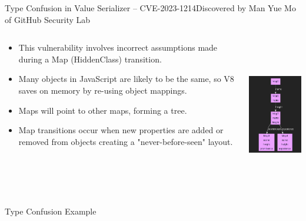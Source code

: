 \begin{frame}{Type Confusion in Value Serializer -- CVE-2023-1214}{Discovered by Man Yue Mo of GitHub Security Lab}
    \begin{columns}
        \begin{column}{0.7\textwidth}
            \begin{itemize}
                \item This vulnerability involves incorrect assumptions made during a Map (HiddenClass) transition.
                \item Many objects in JavaScript are likely to be the same, so V8 saves on memory by re-using object mappings.
                \item Maps will point to other maps, forming a tree.
                \item Map transitions occur when new properties are added or removed from objects creating a "never-before-seen" layout. 
            \end{itemize}
        \href{https://bugs.chromium.org/p/chromium/issues/detail?id=1412487}{\color{pink}{crbug-1412487}}
        \end{column}
        \begin{column}{0.3\textwidth}
            \includegraphics[height=6.5cm]{images/v8-hiddenclass.png}
        \end{column}
    \end{columns}
\end{frame}

\begin{frame}[fragile]{Type Confusion Example}
    \begin{columns}
        \begin{column}{0.5\textwidth}
            \inputminted{C}{code/type-confusion.tex}
        \end{column}
        \begin{column}{0.5\textwidth}
            \inputminted{C}{code/type-confusion-exploit.tex}
        \end{column}
    \end{columns}
\end{frame}